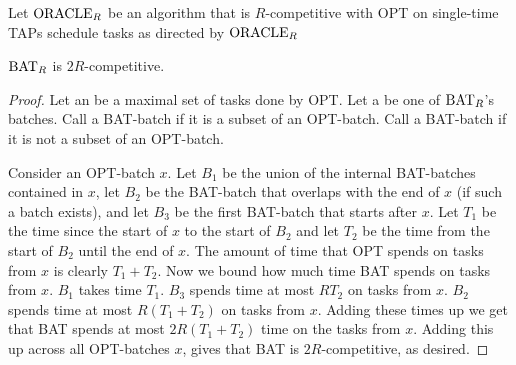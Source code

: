 \begin{algorithm}
  \caption{$\bat_R$}
  \label{alg:bat}
  \begin{algorithmic}
    \State Let $\operatorname{\text{ORACLE}}_R$ be an algorithm that is $R$-competitive with OPT on single-time TAPs 
      \State schedule tasks as directed by $\operatorname{\text{ORACLE}}_R$
    \EndIf
  \end{algorithmic}
\end{algorithm}

\begin{theorem}
  \label{thm:constant_competitive}
  $\bat_R$ is $2R$-competitive.
\end{theorem}
\begin{proof}
  Let an  be a maximal set of tasks done by OPT.
  Let a  be one of $\bat_R$'s batches. Call a BAT-batch
   if it is a subset of an OPT-batch. Call a
  BAT-batch  if it is not a subset of an
  OPT-batch. 

  Consider an OPT-batch $x$. Let $B_1$ be the union of the
  internal BAT-batches contained in $x$, let $B_2$ be the
  BAT-batch that overlaps with the end of $x$ (if such a batch
  exists), and let $B_3$ be the first BAT-batch that starts after
  $x$. Let $T_1$ be the time since the start of $x$ to the start
  of $B_2$ and let $T_2$ be the time from the start of $B_2$
  until the end of $x$. The amount of time that OPT spends on
  tasks from $x$ is clearly $T_1+T_2$. Now we bound how much time
  BAT spends on tasks from $x$. $B_1$ takes time $T_1$. $B_3$
  spends time at most $RT_2$ on tasks from $x$. $B_2$ spends time
  at most $R(T_1 + T_2)$ on tasks from $x$. Adding these times up
  we get that BAT spends at most $2R(T_1+T_2)$ time on the tasks
  from $x$. Adding this up across all OPT-batches $x$, gives that
  BAT is $2R$-competitive, as desired.
\end{proof}

